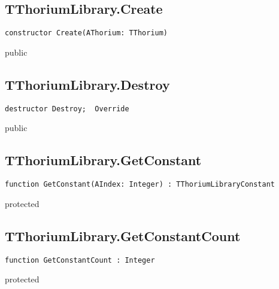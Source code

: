 \subsection{TThoriumLibrary.Create}
\label{thoriumcorepkg:thorium:tthoriumlibrary:create}
\begin{FPCList}
\Declaration 

\begin{verbatim}
constructor Create(AThorium: TThorium)
\end{verbatim}
\Visibility
public
\end{FPCList}
\subsection{TThoriumLibrary.Destroy}
\label{thoriumcorepkg:thorium:tthoriumlibrary:destroy}
\begin{FPCList}
\Declaration 

\begin{verbatim}
destructor Destroy;  Override
\end{verbatim}
\Visibility
public
\end{FPCList}
\subsection{TThoriumLibrary.GetConstant}
\label{thoriumcorepkg:thorium:tthoriumlibrary:getconstant}
\begin{FPCList}
\Declaration 

\begin{verbatim}
function GetConstant(AIndex: Integer) : TThoriumLibraryConstant
\end{verbatim}
\Visibility
protected
\end{FPCList}
\subsection{TThoriumLibrary.GetConstantCount}
\label{thoriumcorepkg:thorium:tthoriumlibrary:getconstantcount}
\begin{FPCList}
\Declaration 

\begin{verbatim}
function GetConstantCount : Integer
\end{verbatim}
\Visibility
protected
\end{FPCList}
